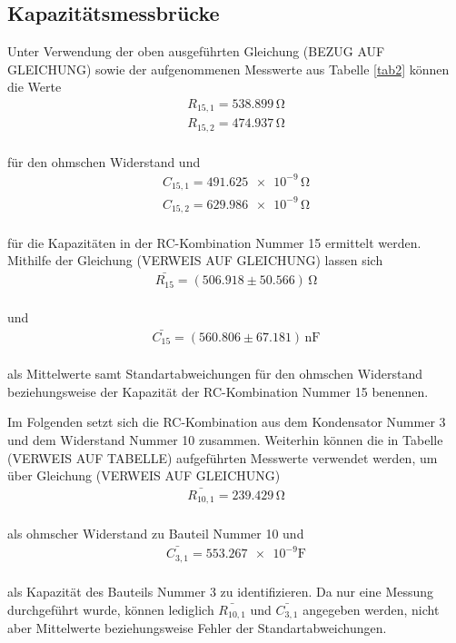 \subsection{Kapazitätsmessbrücke}

Unter Verwendung der oben ausgeführten Gleichung (BEZUG AUF GLEICHUNG) sowie der aufgenommenen
Messwerte aus Tabelle \ref{tab2} können die Werte 
\begin{align}
R_{15,1} = 538.899\,\si{\ohm} \nonumber \\
R_{15,2} = 474.937\,\si{\ohm} \nonumber  
\end{align}
\\
für den ohmschen Widerstand und
\begin{align}
C_{15,1} = \num{491.625e-9}\,\si{\ohm} \nonumber \\
C_{15,2} = \num{629.986e-9}\,\si{\ohm} \nonumber 
\end{align}
\\
für die Kapazitäten in der RC-Kombination Nummer 15 ermittelt werden. Mithilfe der Gleichung (VERWEIS AUF GLEICHUNG)
lassen sich 
\begin{align}
\bar{R_{15}} = (506.918 \pm 50.566)\, \si{\ohm} \nonumber 
\end{align}
\\
und
\begin{align}
\bar{C_{15}} = (560.806 \pm 67.181)\, \si{\nano\farad} \nonumber 
\end{align}
\\
als Mittelwerte samt Standartabweichungen für den ohmschen Widerstand beziehungsweise der
Kapazität der RC-Kombination Nummer 15 benennen.



Im Folgenden setzt sich die RC-Kombination aus dem Kondensator Nummer 3 und dem Widerstand Nummer 10 zusammen. Weiterhin 
können die in Tabelle (VERWEIS AUF TABELLE) aufgeführten Messwerte verwendet werden, um über Gleichung
(VERWEIS AUF GLEICHUNG) 
\begin{align}
\bar{R_{10,1}} = 239.429\, \si{\ohm} \nonumber
\end{align}
\\
als ohmscher Widerstand zu Bauteil Nummer 10 und
\begin{align}
\bar{C_{3,1}} = \num{553.267e-9} \si{\farad} \nonumber
\end{align}
\\
als Kapazität des Bauteils Nummer 3 zu identifizieren. Da nur eine Messung durchgeführt wurde, können lediglich $\bar{R_{10,1}}$
und $\bar{C_{3,1}}$ angegeben werden, nicht aber Mittelwerte beziehungsweise Fehler der Standartabweichungen.


